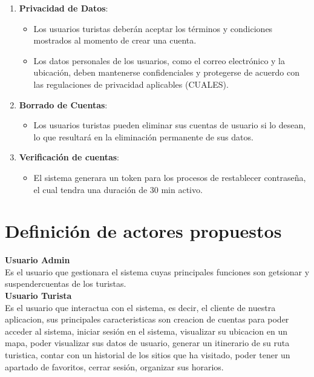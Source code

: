 \documentclass{article}
\begin{document}
\begin{enumerate}
    \item \textbf{Privacidad de Datos}:
    \begin{itemize}
        \item Los usuarios turistas deberán aceptar los términos y condiciones mostrados al momento de crear una cuenta.
        \item Los datos personales de los usuarios, como el correo electrónico y la ubicación, deben mantenerse confidenciales y protegerse de acuerdo con las regulaciones de privacidad aplicables (CUALES).
    \end{itemize}
    
    \item \textbf{Borrado de Cuentas}:
    \begin{itemize}
        \item Los usuarios turistas pueden eliminar sus cuentas de usuario si lo desean, lo que resultará en la eliminación permanente de sus datos.
    \end{itemize}
    \item \textbf{Verificación de cuentas}:
    \begin{itemize}
        \item El sistema generara un token para los procesos de restablecer contraseña, el cual tendra una duración de 30 min activo.
    \end{itemize}
\end{enumerate}


    
\section{\textcolor{azul}{Definición de actores propuestos}}
\textbf{Usuario Admin}\\
Es el usuario que gestionara  el sistema cuyas principales funciones son getsionar y suspendercuentas de los turistas.\\
\vspace{.5cm}
\textbf{Usuario Turista}\\
Es el usuario que interactua con el sistema, es decir, el cliente de nuestra aplicacion, sus principales caracteristicas son creacion de cuentas para poder acceder al sistema, iniciar sesión en el sistema, visualizar su ubicacion en un mapa, poder visualizar sus datos de usuario, generar un itinerario de su ruta turistica, contar con un historial de los sitios que ha visitado, poder tener un apartado de favoritos, cerrar sesión, organizar sus horarios. 
\end{document}
